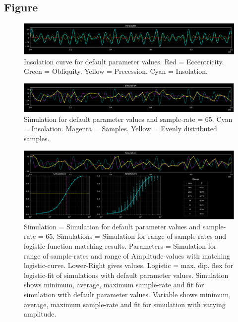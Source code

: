 \documentclass[12pt]{article}
\begin{document}
\subsection*{Figure}

\begin{figure}[hbtp]
\centering
\includegraphics[width=\textwidth]{insolation.png}
\caption{Insolation curve for default parameter values. Red = Eccentricity. Green = Obliquity. Yellow = Precession. Cyan = Insolation.}
\label{fig:insolation}
\end{figure}

\begin{figure}[hbtp]
\centering
\includegraphics[width=\textwidth]{simulation.png}
\caption{Simulation for default parameter values and sample-rate = 65. Cyan = Insolation. Magenta = Samples. Yellow = Evenly distributed samples.}
\label{fig:simulation}
\end{figure}

\begin{figure}[hbtp]
\centering
\includegraphics[width=\textwidth]{constant.png}
\caption{Simulation = Simulation for default parameter values and sample-rate = 65. Simulations = Simulation for range of sample-rates and logistic-function matching results. Parameters = Simulation for range of sample-rates and range of Amplitude-values with matching logistic-curve. Lower-Right gives values. Logistic = max, dip, flex for logistic-fit of simulations with default parameter values. Simulation shows minimum, average, maximum sample-rate and fit for simulation with default parameter values. Variable shows minimum, average, maximum sample-rate and fit for simulation with varying amplitude.}
\label{fig:constant}
\end{figure}
\end{document}

